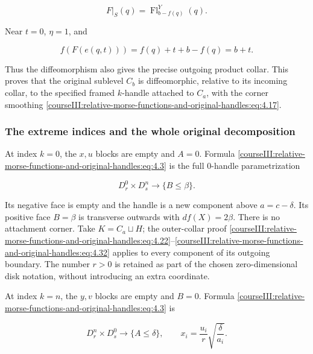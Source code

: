 \begin{equation}
F|_S(q)=\operatorname{Fl}^Y_{b-f(q)}(q).
\label{courseIII:relative-morse-functions-and-original-handles:eq:4.31}
\end{equation}

Near \(t=0\), \(\eta=1\), and

\begin{equation}
f(F(e(q,t)))=f(q)+t+b-f(q)=b+t.
\label{courseIII:relative-morse-functions-and-original-handles:eq:4.32}
\end{equation}

Thus the diffeomorphism also gives the precise outgoing product collar. This proves that the original sublevel \(C_b\) is diffeomorphic, relative to its incoming collar, to the specified framed \(k\)-handle attached to \(C_a\), with the corner smoothing \eqref{courseIII:relative-morse-functions-and-original-handles:eq:4.17}.

\subsubsection{The extreme indices and the whole original decomposition}
\label{courseIII:relative-morse-functions-and-original-handles:section-4.4}

At index \(k=0\), the \(x,u\) blocks are empty and \(A=0\). Formula \eqref{courseIII:relative-morse-functions-and-original-handles:eq:4.3} is the full \(0\)-handle parametrization

\begin{equation}
D_r^0\times D_s^n\longrightarrow\{B\leq\beta\}.
\label{courseIII:relative-morse-functions-and-original-handles:eq:4.33}
\end{equation}

Its negative face is empty and the handle is a new component above \(a=c-\delta\). Its positive face \(B=\beta\) is transverse outwards with \(df(X)=2\beta\). There is no attachment corner. Take \(K=C_a\sqcup H\); the outer-collar proof \eqref{courseIII:relative-morse-functions-and-original-handles:eq:4.22}--\eqref{courseIII:relative-morse-functions-and-original-handles:eq:4.32} applies to every component of its outgoing boundary. The number \(r>0\) is retained as part of the chosen zero-dimensional disk notation, without introducing an extra coordinate.

At index \(k=n\), the \(y,v\) blocks are empty and \(B=0\). Formula \eqref{courseIII:relative-morse-functions-and-original-handles:eq:4.3} is

\begin{equation}
D_r^n\times D_s^0\longrightarrow
\{A\leq\delta\},\qquad
x_i=\frac{u_i}{r}\sqrt{\frac{\delta}{a_i}}.
\label{courseIII:relative-morse-functions-and-original-handles:eq:4.34}
\end{equation}

